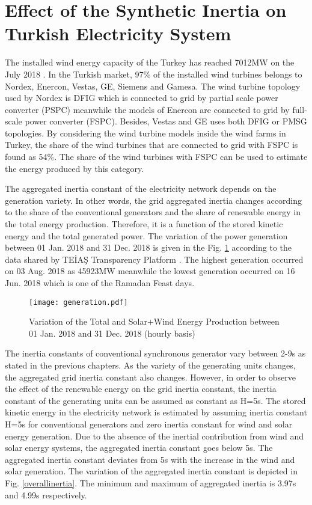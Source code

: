 \section{Effect of the Synthetic Inertia on Turkish Electricity System}
The installed wind energy capacity of the Turkey has reached 7012MW on the July 2018 \cite{July2018}. In the Turkish market, 97\% of the installed wind turbines belongs to Nordex, Enercon, Vestas, GE, Siemens and Gamesa. The wind turbine topology used by Nordex is DFIG which is connected to grid by partial scale power converter (PSPC) meanwhile the models of Enercon are connected to grid by full-scale power converter (FSPC). Besides, Vestas and GE uses both DFIG or PMSG topologies. By considering the wind turbine models inside the wind farms in Turkey, the share of the wind turbines that are connected to grid with FSPC is found as 54\%. The share of the wind turbines with FSPC can be used to estimate the energy produced by this category. \par
The aggregated inertia constant of the electricity network depends on the generation variety. In other words, the grid aggregated inertia changes according to the share of the conventional generators and the share of renewable energy in the total energy production. Therefore, it is a function of the stored kinetic energy and the total generated power. The variation of the power generation between 01 Jan. 2018 and 31 Dec. 2018 is given in the Fig. \ref{overallprod} according to the data shared by TEİAŞ Transparency Platform \cite{TEIAS2019}. The highest generation occurred on 03 Aug. 2018 as 45923MW meanwhile the lowest generation occurred on 16 Jun. 2018 which is one of the Ramadan Feast days. \par
\begin{figure}[h!]
	\centering
	\texttt{[image: generation.pdf]}
	\caption{Variation of the Total and Solar+Wind Energy Production between 01 Jan. 2018 and 31 Dec. 2018 (hourly basis)\cite{TEIAS2019}}
	\label{overallprod}
\end{figure}
The  inertia constants of conventional synchronous generator vary between 2-9s \cite{Kundur} as stated in the previous chapters. As the variety of the generating units changes, the aggregated grid inertia constant also changes. However, in order to observe the effect of the renewable energy on the grid inertia constant, the inertia constant of the generating units can be assumed as constant as H=5s. The stored kinetic energy in the electricity network is estimated by assuming inertia constant H=5s for conventional generators and zero inertia constant for wind and solar energy generation. Due to the absence of the inertial contribution from wind and solar energy systems, the aggregated inertia constant goes below 5s. The aggregated inertia constant deviates from 5s with the increase in the wind and solar generation. The variation of the aggregated inertia constant is depicted in Fig. \ref{overallinertia}. The minimum and maximum of aggregated inertia is 3.97s and 4.99s respectively.\par
